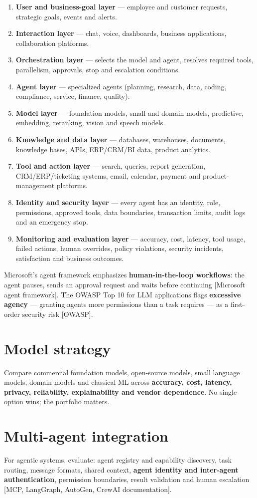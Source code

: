 \begin{enumerate}
  \item \textbf{User and business-goal layer} — employee and customer
        requests, strategic goals, events and alerts.
  \item \textbf{Interaction layer} — chat, voice, dashboards, business
        applications, collaboration platforms.
  \item \textbf{Orchestration layer} — selects the model and agent, resolves
        required tools, parallelism, approvals, stop and escalation
        conditions.
  \item \textbf{Agent layer} — specialized agents (planning, research, data,
        coding, compliance, service, finance, quality).
  \item \textbf{Model layer} — foundation models, small and domain models,
        predictive, embedding, reranking, vision and speech models.
  \item \textbf{Knowledge and data layer} — databases, warehouses, documents,
        knowledge bases, APIs, ERP/CRM/BI data, product analytics.
  \item \textbf{Tool and action layer} — search, queries, report generation,
        CRM/ERP/ticketing systems, email, calendar, payment and
        product-management platforms.
  \item \textbf{Identity and security layer} — every agent has an identity,
        role, permissions, approved tools, data boundaries, transaction
        limits, audit logs and an emergency stop.
  \item \textbf{Monitoring and evaluation layer} — accuracy, cost, latency,
        tool usage, failed actions, human overrides, policy violations,
        security incidents, satisfaction and business outcomes.
\end{enumerate}

Microsoft's agent framework emphasizes \textbf{human-in-the-loop workflows}:
the agent pauses, sends an approval request and waits before continuing
[Microsoft agent framework]. The OWASP Top 10 for LLM applications flags
\textbf{excessive agency} — granting agents more permissions than a task
requires — as a first-order security risk [OWASP].

\section{Model strategy}

Compare commercial foundation models, open-source models, small language
models, domain models and classical ML across \textbf{accuracy, cost, latency,
privacy, reliability, explainability and vendor dependence}. No single option
wins; the portfolio matters.

\section{Multi-agent integration}

For agentic systems, evaluate: agent registry and capability discovery, task
routing, message formats, shared context, \textbf{agent identity and
inter-agent authentication}, permission boundaries, result validation and
human escalation [MCP, LangGraph, AutoGen, CrewAI documentation].
